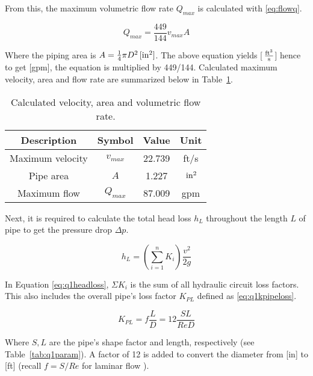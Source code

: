From this, the maximum volumetric flow rate $Q_{max}$ is calculated with \ref{eq:flowq}.

\begin{equation}
	\label{eq:flowq}
	Q_{max} =  \frac{449}{144} v_{max} A	
\end{equation} 

Where the piping area is $ A = \frac{1}{4}\pi D^2 \,\mathrm{[in^2]}$. The above equation yields [$\,\mathrm{\frac{ft^3}{s}}$] hence to get [gpm], the equation is multiplied by 449/144. Calculated maximum velocity, area and flow rate are summarized below in Table~\ref{tab:q1ans1}.

\begin{table}[H]
  \centering
  \caption{Calculated velocity, area and volumetric flow rate.}
    \begin{tabular}{cccc}
    \toprule
    \textbf{Description} & \textbf{Symbol} & \textbf{Value } & \textbf{Unit} \\
    \midrule
    Maximum velocity	& $v_{max}$	& 22.739	& ft/s \\
    Pipe area 			& $A$     	& 1.227 	& $\,\mathrm{in^2}$ \\
    Maximum flow 		& $Q_{max}$	& 87.009 	& gpm \\
    \bottomrule
    \end{tabular}
  \label{tab:q1ans1}
\end{table}

Next, it is required to calculate the total head loss $h_L$ throughout the length $L$ of pipe to get the pressure drop $\Delta p$.

\begin{equation}
	\label{eq:q1headloss}	
	h_L = \left( \sum_{i=1}^{n} K_i \right) \frac{v^2}{2g} 
\end{equation}
 
In Equation \ref{eq:q1headloss}, $\Sigma K_i$ is the sum of all hydraulic circuit loss factors. This also includes the overall pipe's loss factor $K_{PL}$ defined as \ref{eq:q1kpipeloss}.

\begin{equation}
	\label{eq:q1kpipeloss}	
	K_{PL} = f \frac{L}{D} = 12 \frac{SL}{Re D}
\end{equation}

Where $S,L$ are the pipe's shape factor and length, respectively (see Table~\ref{tab:q1param}). A factor of 12 is added to convert the diameter from [in] to [ft] (recall $f=S/Re$ for laminar flow \cite{fluids}).\\

